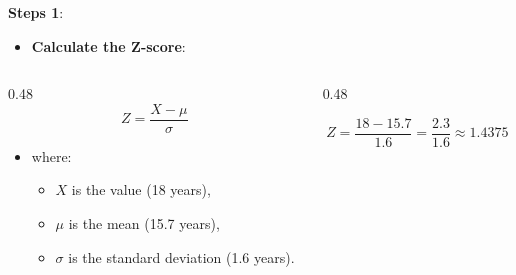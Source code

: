 \documentclass[
  ignorenonframetext,
]{beamer}
\providecommand{\tightlist}{%
  \setlength{\itemsep}{0pt}\setlength{\parskip}{0pt}}
\begin{document}
\begin{frame}{\textbf{Steps 1}:}
\label{steps-1}
\begin{itemize}
\tightlist
\item
  \textbf{Calculate the Z-score}:
\end{itemize}

\begin{columns}[T]
\begin{column}{0.48\linewidth}
\[
   Z = \frac{X - \mu}{\sigma}
   \]

\begin{itemize}
\tightlist
\item
  where:

  \begin{itemize}
  \tightlist
  \item
    \(X\) is the value (18 years),
  \item
    \(\mu\) is the mean (15.7 years),
  \item
    \(\sigma\) is the standard deviation (1.6 years).
  \end{itemize}
\end{itemize}
\end{column}

\begin{column}{0.48\linewidth}
\vspace{1cm}

\[
   Z = \frac{18 - 15.7}{1.6} = \frac{2.3}{1.6} \approx 1.4375
   \]
\end{column}
\end{columns}
\end{frame}
\end{document}

